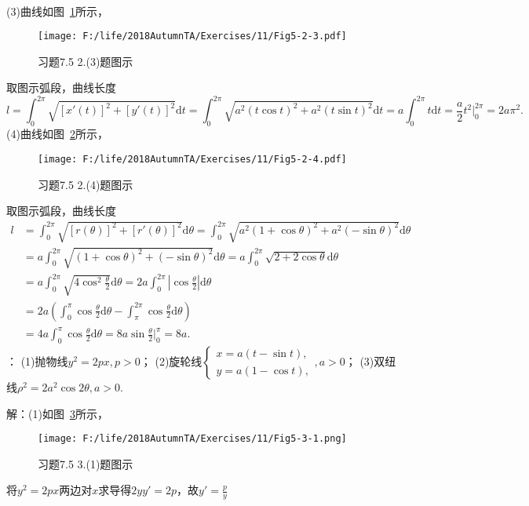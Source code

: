 \documentclass[12pt,UTF8]{ctexart}
\begin{document}
\begin{enumerate}
\[\begin{split}
\end{split}\]
(3)曲线如图~\ref{5-2-3}所示，
\begin{figure}[H]
\begin{center}
\texttt{[image: F:/life/2018AutumnTA/Exercises/11/Fig5-2-3.pdf]}
\end{center}
\caption{习题7.5 2.(3)题图示}
\label{5-2-3}
\end{figure}
取图示弧段，曲线长度
\[l=\int_0^{2\pi}\sqrt{[x'(t)]^2+[y'(t)]^2}\mathrm dt=\int_0^{2\pi}\sqrt{a^2(t\cos t)^2+a^2(t\sin t)^2}\mathrm dt=a\int_0^{2\pi}t\mathrm dt=\frac a2t^2\Big|_0^{2\pi}
=2a\pi^2.\]
(4)曲线如图~\ref{5-2-4}所示，
\begin{figure}[H]
\begin{center}
\texttt{[image: F:/life/2018AutumnTA/Exercises/11/Fig5-2-4.pdf]}
\end{center}
\caption{习题7.5 2.(4)题图示}
\label{5-2-4}
\end{figure}
取图示弧段，曲线长度
\[\begin{split}
l&=\int_0^{2\pi}\sqrt{[r(\theta)]^2+[r'(\theta)]^2}\mathrm d\theta=\int_0^{2\pi}\sqrt{a^2(1+\cos\theta)^2+a^2(-\sin\theta)^2}\mathrm d\theta\\
&=a\int_0^{2\pi}\sqrt{(1+\cos\theta)^2+(-\sin\theta)^2}\mathrm d\theta=a\int_0^{2\pi}\sqrt{2+2\cos\theta}\mathrm d\theta\\
&=a\int_0^{2\pi}\sqrt{4\cos^2\frac\theta2}\mathrm d\theta=2a\int_0^{2\pi}|\cos\frac\theta2|\mathrm d\theta\\
&=2a(\int_{0}^{\pi}\cos\frac\theta2\mathrm d\theta-\int_{\pi}^{2\pi}\cos\frac\theta2\mathrm d\theta)\\
&=4a\int_{0}^{\pi}\cos\frac\theta2\mathrm d\theta=8a\sin\frac\theta2\Big|_0^\pi=8a.
\end{split}\]
：
\newline
(1)抛物线$y^2=2px,p>0$；
\newline
(2)旋轮线$\begin{cases}
x=a(t-\sin t),\\
y=a(1-\cos t),
\end{cases},a>0$；
\newline
(3)双纽线$\rho^2=2a^2\cos2\theta,a>0$.

解：(1)如图~\ref{5-3-1}所示，
\begin{figure}[H]
\begin{center}
\texttt{[image: F:/life/2018AutumnTA/Exercises/11/Fig5-3-1.png]}
\end{center}
\caption{习题7.5 3.(1)题图示}
\label{5-3-1}
\end{figure}
将$y^2=2px$两边对$x$求导得$2yy'=2p$，故$y'=\frac{p}y$


\end{enumerate}
\end{document}
